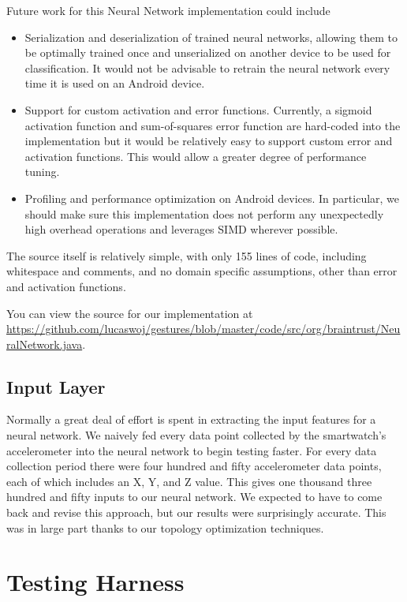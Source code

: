 \documentclass{report}
\begin{document}
Future work for this Neural Network implementation could include
\begin{itemize}
\item Serialization and deserialization of trained neural networks, allowing them to be optimally trained once and unserialized on another device to be used for classification. It would not be advisable to retrain the neural network every time it is used on an Android device.
\item Support for custom activation and error functions. Currently, a sigmoid activation function and sum-of-squares error function are hard-coded into the implementation but it would be relatively easy to support custom error and activation functions. This would allow a greater degree of performance tuning.
\item Profiling and performance optimization on Android devices. In particular, we should make sure this implementation does not perform any unexpectedly high overhead operations and leverages SIMD wherever possible.
\end{itemize}

The source itself is relatively simple, with only 155 lines of code, including whitespace and comments, and no domain specific assumptions, other than error and activation functions.

You can view the source for our implementation at \url{https://github.com/lucaswoj/gestures/blob/master/code/src/org/braintrust/NeuralNetwork.java}.

\subsection{Input Layer}
Normally a great deal of effort is spent in extracting the input features for a neural network. We naively fed every data point collected by the smartwatch's accelerometer into the neural network to begin testing faster. For every data collection period there were four hundred and fifty accelerometer data points, each of which includes an X, Y, and Z value. This gives one thousand three hundred and fifty inputs to our neural network. We expected to have to come back and revise this approach, but our results were surprisingly accurate. This was in large part thanks to our topology optimization techniques. 

\section{Testing Harness}
\end{document}
